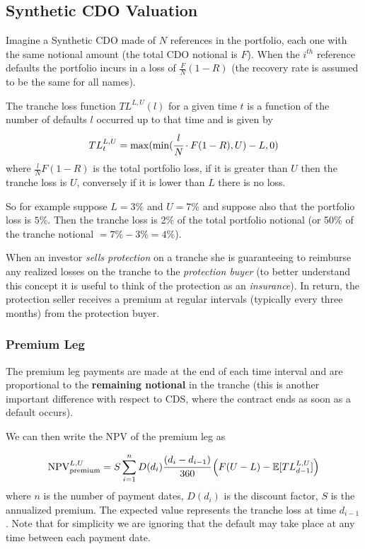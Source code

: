 \subsection{Synthetic CDO Valuation}
Imagine a Synthetic CDO made of $N$ references in the portfolio, each one with the same notional amount (the total CDO notional is $F$).
When the $i^{th}$ reference defaults the portfolio incurs in a loss of $\frac{F}{N}(1-R)$ (the recovery rate is assumed to be the same for all names).

The tranche loss function $TL^{L,U}(l)$ for a given time $t$ is a function of the number of defaults $l$ occurred up to that time and is given by
\begin{equation}
TL_{t}^{L,U}=\mathrm{max}(\mathrm{min}(\cfrac{l}{N}\cdot F(1-R), U)-L, 0)
\end{equation}
where $\frac{l}{N}F(1-R)$ is the total portfolio loss, if it is greater than $U$ then the tranche loss is $U$, conversely if it is lower than $L$ there is no loss.

So for example suppose $L=3\%$ and $U=7\%$ and suppose also that the portfolio loss is $5\%$. Then the tranche loss is 2\% of the total portfolio notional (or 50\% of the tranche notional $=7\%-3\%=4\%$).

When an investor \emph{sells protection} on a tranche she is guaranteeing to reimburse any realized losses on the tranche to the \emph{protection buyer} (to better understand this concept it is useful to think of the protection as an \emph{insurance}). 
In return, the protection seller receives a premium at regular intervals (typically every three months) from the protection buyer.

\subsubsection{Premium Leg}
The premium leg payments are made at the end of each time interval and are proportional to the \textbf{remaining notional} in the tranche (this is another important difference with respect to CDS, where the contract ends as soon as a default occurs).

We can then write the NPV of the premium leg as

\begin{equation}
\mathrm{NPV}_{\mathrm{premium}}^{L,U}=S\sum^{n}_{i=1}D(d_i)\cfrac{(d_i - d_{i-1})}{360}\left(F(U-L)-\mathbb{E}[TL_{d-1}^{L,U}]\right)
\label{eq:cdo_npv_premium}
\end{equation}
where $n$ is the number of payment dates, $D(d_i)$ is the discount factor, $S$ is the annualized premium. The expected value represents the tranche loss at time $d_{i-1}$. Note that for simplicity we are ignoring that the default may take place at any time between each payment date.

